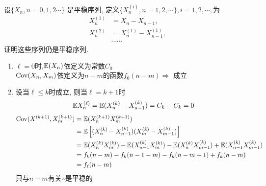 \begin{problem}{4.2}
设$\{X_n, n = 0,1,2\cdots\}$ 是平稳序列, 定义$\{X^{(i)}_n, n = 1,2,\cdots\}, i = 1, 2, \cdots, $为
\[\begin{aligned}
		X^{(1)}_n & = X_n - X_{n-1},             \\
		X^{(2)}_n & = X^{(1)}_n - X^{(1)}_{n-1}, \\
		          & \cdots\cdots
	\end{aligned}
\]
证明这些序列仍是平稳序列.\\
\end{problem}
\begin{solution}
	\begin{enumerate}[label=$\arabic*^\circ$]
		\item $\ell = 0$时,$\mathbb{E}(X_n)$依定义为常数$C_0$\\
		      $\mathrm{Cov}(X_n, X_m)$依定义为$n-m$的函数$f_0(n-m)\Rightarrow$ 成立
		\item 设当$\ell \leqslant k$时成立, 则当$\ell = k + 1$时
		      \[\mathbb{E} X^{(\ell)}_n = \mathbb{E}(X^{(k)}_n - X^{(k)}_{n-1}) = C_k - C_k = 0\]
		      \[
			      \begin{split}
				      \mathrm{Cov}(X^{(k+1)}, X^{(k+1)}_m) & = \mathbb{E}(X^{(k+1)}_n X^{(k+1)}_m)\\
				      & = \mathbb{E}\left[(X^{(k)}_n - X^{(k)}_{n-1})(X^{(k)}_m - X^{(k)}_{m-1})\right]\\
				      & = \mathbb{E}(X^{(k)}_n X^{(k)}_m) - \mathbb{E}(X^{(k)}_{n-1}X^{(k)}_m) - \mathbb{E}(X^{(k)}_{n}X^{(k)}_{m-1}) + \mathbb{E}(X^{(k)}_{n-1}X^{(k)}_{m-1})\\
				      & = f_k(n-m) - f_k(n-1-m) - f_k(n-m+1) + f_k(n-m)\\
				      & = f_{\ell}(n-m)
			      \end{split}
		      \]
		      只与$n-m$有关\quad $\therefore$是平稳的
	\end{enumerate}
\end{solution}

